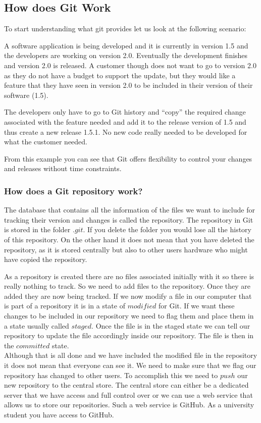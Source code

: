 \documentclass[
]{book}
\begin{document}
\hypertarget{how-does-git-work}{%
\subsection{How does Git Work}\label{how-does-git-work}}

To start understanding what git provides let us look at the following scenario:

A software application is being developed and it is currently in version 1.5 and the developers are working on version 2.0.
Eventually the development finishes and version 2.0 is released. A customer though does not want to go to version 2.0 as they do not have a budget to support the update, but they would like a feature that they have seen in version 2.0 to be included in their version of their software (1.5).

The developers only have to go to Git history and ``copy'' the required change associated with the feature needed and add it to the release version of 1.5 and thus create a new release 1.5.1.
No new code really needed to be developed for what the customer needed.

From this example you can see that Git offers flexibility to control your changes and releases without time constraints.

\hypertarget{how-does-a-git-repository-work}{%
\subsubsection{How does a Git repository work?}\label{how-does-a-git-repository-work}}

The database that contains all the information of the files we want to include for tracking their version and changes is called the repository. The repository in Git is stored in the folder \(.git\). If you delete the folder you would lose all the history of this repository. On the other hand it does not mean that you have deleted the repository, as it is stored centrally but also to other users hardware who might have copied the repository.

As a repository is created there are no files associated initially with it so there is really nothing to track. So we need to add files to the repository. Once they are added they are now being tracked. If we now modify a file in our computer that is part of a repository it is in a state of \(modified\) for Git. If we want these changes to be included in our repository we need to flag them and place them in a state usually called \(staged\). Once the file is in the staged state we can tell our repository to update the file accordingly inside our repository. The file is then in the \(committed\) state.\\
Although that is all done and we have included the modified file in the repository it does not mean that everyone can see it. We need to make sure that we flag our repository has changed to other users. To accomplish this we need to \(push\) our new repository to the central store.
The central store can either be a dedicated server that we have access and full control over or we can use a web service that allows us to store our repositories. Such a web service is GitHub.
As a university student you have access to GitHub.
\end{document}
